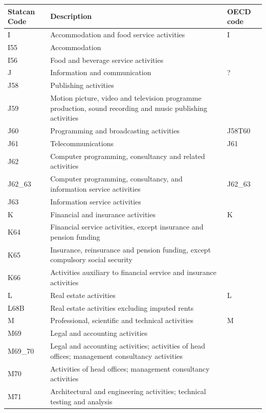 \documentclass[12pt]{article}
\begin{document}
\small
{}
\begin{tabularx}{\textwidth}{l X l}
\hline
\textbf{Statcan Code} & \textbf{Description} & \textbf{OECD code} \\
\hline
\hline
I       & Accommodation and food service activities & I \\
I55     & Accommodation &  \\
I56     & Food and beverage service activities &  \\
J       & Information and communication & ? \\
J58     & Publishing activities &  \\
J59     & Motion picture, video and television programme production, sound recording and music publishing activities &  \\
J60     & Programming and broadcasting activities & J58T60 \\
J61     & Telecommunications & J61 \\
J62     & Computer programming, consultancy and related activities &  \\
J62\_63 & Computer programming, consultancy, and information service activities & J62\_63 \\
J63     & Information service activities &  \\
K       & Financial and insurance activities & K \\
K64     & Financial service activities, except insurance and pension funding &  \\
K65     & Insurance, reinsurance and pension funding, except compulsory social security &  \\
K66     & Activities auxiliary to financial service and insurance activities &  \\
L       & Real estate activities & L \\
L68B    & Real estate activities excluding imputed rents & \\
M       & Professional, scientific and technical activities & M \\
M69     & Legal and accounting activities &  \\
M69\_70 & Legal and accounting activities; activities of head offices; management consultancy activities &  \\
M70     & Activities of head offices; management consultancy activities &  \\
M71     & Architectural and engineering activities; technical testing and analysis &  \\

\end{tabularx}
\end{document}
